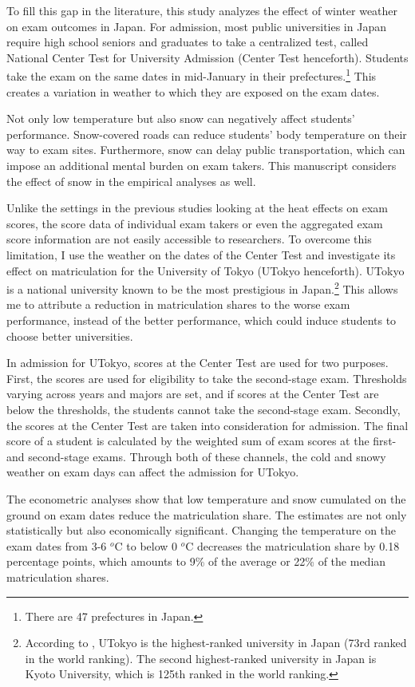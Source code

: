 \documentclass[12pt,letterpaper]{article}
\begin{document}
To fill this gap in the literature, this study analyzes the effect of winter weather on exam outcomes in Japan.
For admission, most public universities in Japan require high school seniors and graduates to take a centralized test, called National Center Test for University Admission (Center Test henceforth).
Students take the exam on the same dates in mid-January in their prefectures.\footnote{
  There are 47 prefectures in Japan.
}
This creates a variation in weather to which they are exposed on the exam dates.

Not only low temperature but also snow can negatively affect students' performance.
Snow-covered roads can reduce students' body temperature on their way to exam sites.
Furthermore, snow can delay public transportation, which can impose an additional mental burden on exam takers.
This manuscript considers the effect of snow in the empirical analyses as well.

Unlike the settings in the previous studies looking at the heat effects on exam scores, the score data of individual exam takers or even the aggregated exam score information are not easily accessible to researchers.
To overcome this limitation, I use the weather on the dates of the Center Test and investigate its effect on matriculation for the University of Tokyo (UTokyo henceforth).
UTokyo is a national university known to be the most prestigious in Japan.\footnote{
  According to \citet{usnews}, UTokyo is the highest-ranked university in Japan (73rd ranked in the world ranking).
  The second highest-ranked university in Japan is Kyoto University, which is 125th ranked in the world ranking.
}
This allows me to attribute a reduction in matriculation shares to the worse exam performance, instead of the better performance, which could induce students to choose better universities.

In admission for UTokyo, scores at the Center Test are used for two purposes.
First, the scores are used for eligibility to take the second-stage exam.
Thresholds varying across years and majors are set, and if scores at the Center Test are below the thresholds, the students cannot take the second-stage exam.
Secondly, the scores at the Center Test are taken into consideration for admission.
The final score of a student is calculated by the weighted sum of exam scores at the first- and second-stage exams.
Through both of these channels, the cold and snowy weather on exam days can affect the admission for UTokyo.

The econometric analyses show that low temperature and snow cumulated on the ground on exam dates reduce the matriculation share.
The estimates are not only statistically but also economically significant.
Changing the temperature on the exam dates from 3-6 $^o$C to below 0 $^o$C decreases the matriculation share by 0.18 percentage points, which amounts to 9\% of the average or 22\% of the median matriculation shares.
\end{document}
